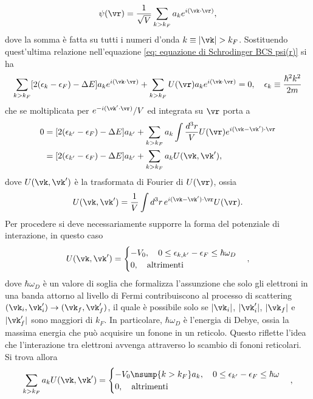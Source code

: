 \begin{equation}
    \psi(\vr) = \frac{1}{\sqrt{V}}\sum_{k  > k_F}a_ke^{i(\vk \cdot \vr)},
\end{equation}
dove la somma è fatta su tutti i numeri d'onda $k \equiv |\vk| > k_F$. Sostituendo quest'ultima relazione nell'equazione \eqref{eq: equazione di Schrodinger BCS psi(r)} si ha
\begin{equation}
    \sum_{k > k_F}[2(\epsilon_k - \epsilon_F) - \Delta E]a_ke^{i(\vk \cdot \vr)} + \sum_{k > k_F}U(\vr)a_ke^{i(\vk \cdot \vr)} = 0,\quad \epsilon_k \equiv \frac{\hbar^2k^2}{2m}
\end{equation}
che se moltiplicata per $e^{-i(\vk' \cdot \vr)}/V$ ed integrata su $\vr$ porta a
\begin{equation}
    \begin{split}
        0 &= [2(\epsilon_{k'} - \epsilon_F) - \Delta E]a_{k'} + \sum_{k > k_F}a_k\int\frac{d^3r}{V}U(\vr)e^{i(\vk - \vk')\cdot \vr} \\
        &= [2(\epsilon_{k'} - \epsilon_F) - \Delta E]a_{k'} + \sum_{k > k_F}a_kU(\vk,\vk'),
    \end{split}
\end{equation}
dove $U(\vk,\vk')$ è la trasformata di Fourier di $U(\vr)$, ossia
\begin{equation}
    U(\vk,\vk') = \frac{1}{V}\int d^3r\,e^{i(\vk - \vk')\cdot \vr}U(\vr).
\end{equation}
Per procedere si deve necessariamente supporre la forma del potenziale di interazione, in questo caso
\begin{equation}
    U(\vk,\vk') =
    \begin{cases}
        -V_0,\quad 0 \le \epsilon_{k,k'} - \epsilon_F \le \hbar\omega_D\\
        0,\quad \mathrm{altrimenti}
    \end{cases},
\end{equation}
dove $\hbar\omega_D$ è un valore di soglia che formalizza l'assunzione che solo gli elettroni in una banda attorno al livello di Fermi contribuiscono al processo di scattering $(\vk_i,\vk'_i) \to (\vk_f,\vk'_f)$, il quale è possibile solo se $|\vk_i|$, $|\vk_i'|$, $|\vk_f|$ e $|\vk_f'|$ sono maggiori di $k_F$. In particolare, $\hbar\omega_D$ è l'energia di Debye, ossia la massima energia che può acquisire un fonone in un reticolo. Questo riflette l'idea che l'interazione tra elettroni avvenga attraverso lo scambio di fononi reticolari. Si trova allora
\begin{equation}
    \sum_{k > k_F}a_kU(\vk,\vk') = 
    \begin{cases}
        -V_0\nsump{k > k_F}a_k,\quad 0 \le \epsilon_{k'} - \epsilon_F \le \hbar\omega \\
        0,\quad \mathrm{altrimenti}
    \end{cases},
\end{equation}

